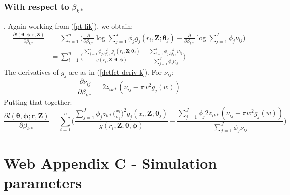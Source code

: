 \documentclass[useAMS,referee]{biom}
\begin{document}
\subsubsection*{With respect to $\beta_{k*}$}. Again working from (\ref{pt-lik}), we obtain:
\begin{align*}
\frac{\partial l(\bm{\theta}, \bm{\phi}; \mathbf{r},\mathbf{Z})}{\partial \beta_{k*}}  &= \sum_{i=1}^n \Big( \frac{\partial}{\partial \beta_{k*}} \log \sum_{j=1}^J \phi_j g_j(r_i,\mathbf{Z}; \bm{\theta}_j) - \frac{\partial}{\partial \beta_{k*}}\log \sum_{j=1}^J \phi_j \nu_{ij}\Big)\\
&= \sum_{i=1}^n \Big( \frac{ \sum_{j=1}^J \phi_{j} \frac{\partial}{\partial \beta_{k*}}  g_{j} (r_i,\mathbf{Z}; \bm{\theta}_j)}{g(r_i,\mathbf{Z}; \bm{\theta}, \bm{\phi})} - \frac{ \sum_{j=1}^J \phi_{j}\frac{\partial}{\partial \beta_{k*}}  \nu_{ij} }{ \sum_{j=1}^J \phi_j \nu_{ij}}\Big)
\end{align*}
The derivatives of $g_j$ are as in (\ref{detfct-deriv-k}). For $\nu_{ij}$:
\begin{equation*}
\frac{\partial \nu_{ij}}{\partial \beta_{k*}} =  2z_{ik*}(\nu_{ij} - \pi w^2 g_j(w))
\end{equation*}
Putting that together:
\begin{equation*}
\frac{\partial l(\bm{\theta}, \bm{\phi}; \mathbf{r},\mathbf{Z})}{\partial \beta_{k*}}  = \sum_{i=1}^n \Big( \frac{ \sum_{j=1}^J \phi_{j} z_{k*} \Big( \frac{x_i}{\sigma_{j}}\Big)^2 g_j(x_i,\mathbf{Z}; \bm{\theta}_j)}{g(r_i,\mathbf{Z}; \bm{\theta}, \bm{\phi})} - \frac{ \sum_{j=1}^J \phi_{j}2z_{ik*}(\nu_{ij} - \pi w^2 g_j(w)) }{ \sum_{j=1}^J \phi_j \nu_{ij}}\Big)
\end{equation*}

\section*{Web Appendix C - Simulation parameters}
\end{document}
